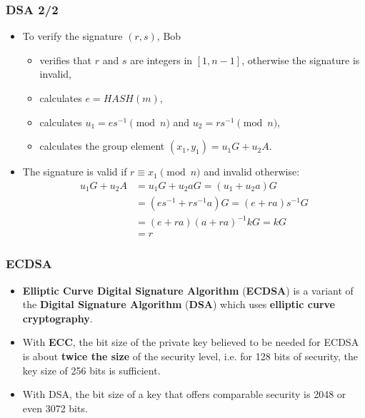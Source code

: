 \documentclass{beamer}
\begin{document}
\begin{frame}
  \frametitle{DSA 2/2}
  \begin{itemize}
  \item To verify the signature $(r, s)$, Bob
    \begin{itemize}
    \item verifies that $r$ and $s$ are integers in $[1, n - 1]$, otherwise the
      signature is invalid,
    \item calculates $e = HASH(m)$,
    \item calculates $u_1 = es^{-1} \pmod{n}$ and $u_2 = rs^{-1} \pmod{n}$,
    \item calculates the group element $(x_1, y_1) = u_1G + u_2A$.
    \end{itemize}
  \item The signature is valid if $r \equiv x_1 \pmod{n}$ and invalid otherwise:
    \begin{align*}
      u_1G + u_2A &= u_1G + u_2aG = (u_1 + u_2a)G \\
                  &= (es^{-1} + rs^{-1}a)G = (e + ra)s^{-1}G \\
                  &= (e + ra)(a + ra)^{-1}kG = kG \\
                  &= r
    \end{align*}
  \end{itemize}
\end{frame}

\begin{frame}
  \frametitle{ECDSA}
  \begin{itemize}  
  \item \textbf{Elliptic Curve Digital Signature Algorithm} (\textbf{ECDSA}) is
    a variant of the \textbf{Digital Signature Algorithm} (\textbf{DSA}) which
    uses \textbf{elliptic curve cryptography}.
  \item With \textbf{ECC}, the bit size of the private key believed to be needed
    for ECDSA is about \textbf{twice the size} of the security level, i.e. for
    128 bits of security, the key size of 256 bits is sufficient.
  \item With DSA, the bit size of a key that offers comparable security is 2048
    or even 3072 bits.
  \end{itemize}
\end{frame}
\end{document}

